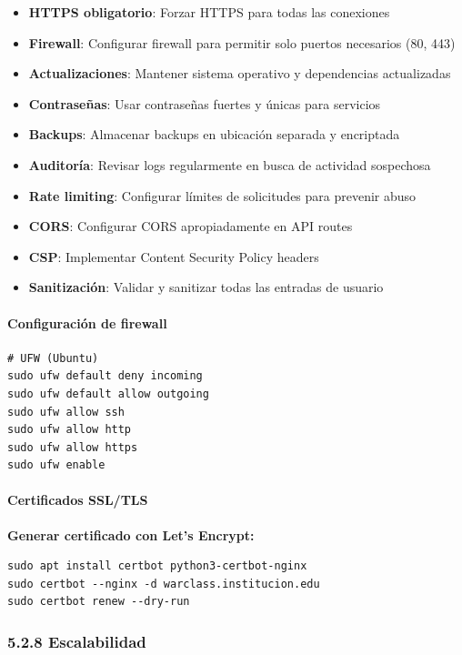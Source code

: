 \begin{itemize}
	\item \textbf{HTTPS obligatorio}: Forzar HTTPS para todas las conexiones
	\item \textbf{Firewall}: Configurar firewall para permitir solo puertos necesarios (80, 443)
	\item \textbf{Actualizaciones}: Mantener sistema operativo y dependencias actualizadas
	\item \textbf{Contraseñas}: Usar contraseñas fuertes y únicas para servicios
	\item \textbf{Backups}: Almacenar backups en ubicación separada y encriptada
	\item \textbf{Auditoría}: Revisar logs regularmente en busca de actividad sospechosa
	\item \textbf{Rate limiting}: Configurar límites de solicitudes para prevenir abuso
	\item \textbf{CORS}: Configurar CORS apropiadamente en API routes
	\item \textbf{CSP}: Implementar Content Security Policy headers
	\item \textbf{Sanitización}: Validar y sanitizar todas las entradas de usuario
\end{itemize}

\paragraph{Configuración de firewall}

\begin{verbatim}
# UFW (Ubuntu)
sudo ufw default deny incoming
sudo ufw default allow outgoing
sudo ufw allow ssh
sudo ufw allow http
sudo ufw allow https
sudo ufw enable
\end{verbatim}

\paragraph{Certificados SSL/TLS}

\textbf{Generar certificado con Let's Encrypt:}

\begin{verbatim}
sudo apt install certbot python3-certbot-nginx
sudo certbot --nginx -d warclass.institucion.edu
sudo certbot renew --dry-run
\end{verbatim}

\subsubsection{5.2.8 Escalabilidad}

